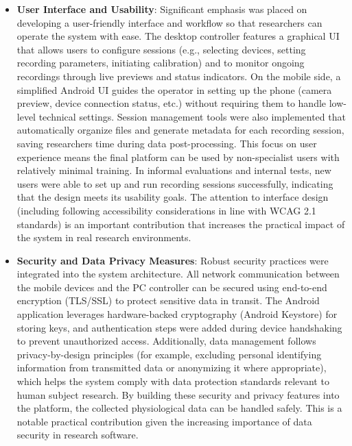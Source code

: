 \begin{itemize}
\item \textbf{User Interface and Usability}: Significant emphasis was placed on developing a user-friendly interface and workflow so that researchers can operate the system with ease. The desktop controller features a graphical UI that allows users to configure sessions (e.g., selecting devices, setting recording parameters, initiating calibration) and to monitor ongoing recordings through live previews and status indicators. On the mobile side, a simplified Android UI guides the operator in setting up the phone (camera preview, device connection status, etc.) without requiring them to handle low-level technical settings. Session management tools were also implemented that automatically organize files and generate metadata for each recording session, saving researchers time during data post-processing. This focus on user experience means the final platform can be used by non-specialist users with relatively minimal training. In informal evaluations and internal tests, new users were able to set up and run recording sessions successfully, indicating that the design meets its usability goals. The attention to interface design (including following accessibility considerations in line with WCAG 2.1 standards) is an important contribution that increases the practical impact of the system in real research environments.

\item \textbf{Security and Data Privacy Measures}: Robust security practices were integrated into the system architecture. All network communication between the mobile devices and the PC controller can be secured using end-to-end encryption (TLS/SSL) to protect sensitive data in transit. The Android application leverages hardware-backed cryptography (Android Keystore) for storing keys, and authentication steps were added during device handshaking to prevent unauthorized access. Additionally, data management follows privacy-by-design principles (for example, excluding personal identifying information from transmitted data or anonymizing it where appropriate), which helps the system comply with data protection standards relevant to human subject research. By building these security and privacy features into the platform, the collected physiological data can be handled safely. This is a notable practical contribution given the increasing importance of data security in research software.


\end{itemize}
